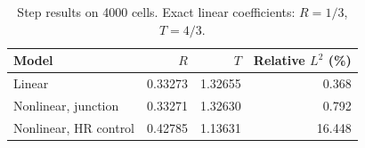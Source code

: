 \begin{table}[htbp]\centering\small
\begin{tabular}{lrrr}\toprule
Model & $R$ & $T$ & Relative $L^2$ (\%) \\
\midrule
Linear & 0.33273 & 1.32655 & 0.368 \\
Nonlinear, junction & 0.33271 & 1.32630 & 0.792 \\
Nonlinear, HR control & 0.42785 & 1.13631 & 16.448 \\
\bottomrule\end{tabular}
\caption{Step results on 4000 cells. Exact linear coefficients: $R=1/3$, $T=4/3$.}\end{table}
